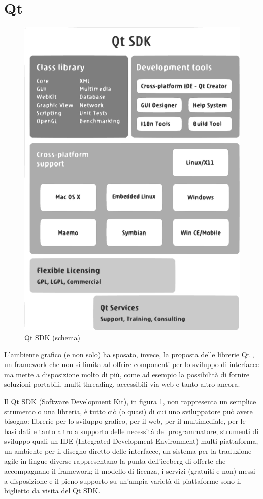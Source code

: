 \section{Qt}

\begin{figure}
 \centering
 \includegraphics[scale=0.85]{immagini/qtschema.pdf}
 \caption{Qt SDK (schema)}
 \label{fig:qtschema}
\end{figure}

L'ambiente grafico (e non solo) ha sposato, invece, la proposta delle librerie Qt \cite{Qt}, un framework che non si limita ad offrire componenti per lo sviluppo di interfacce ma mette a disposizione molto di più, come ad esempio la possibilità di fornire soluzioni portabili, multi-threading, accessibili via web e tanto altro ancora.

Il Qt SDK (Software Development Kit), in figura \ref{fig:qtschema}, non rappresenta un semplice strumento o una libreria, è tutto ciò (o quasi) di cui uno sviluppatore può avere bisogno: librerie per lo sviluppo grafico, per il web, per il multimediale, per le basi dati e tanto altro a supporto delle necessità del programmatore; strumenti di sviluppo quali un IDE (Integrated Development Environment) multi-piattaforma, un ambiente per il disegno diretto delle interfacce, un sistema per la traduzione agile in lingue diverse rappresentano la punta dell'iceberg di offerte che accompagnano il framework; il modello di licenza, i servizi (gratuiti e non) messi a disposizione e il pieno supporto su un'ampia varietà di piattaforme sono il biglietto da visita del Qt SDK.


